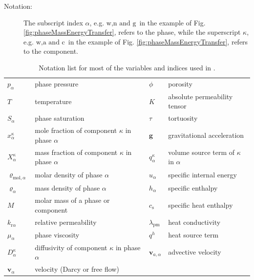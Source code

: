 \begin{description}
\item[Notation:]
The subscript index $\alpha$, e.g. $\text{w}, \text{n} \text{ and } \text{g}$ in the example of Fig. \ref{fig:phaseMassEnergyTransfer}, refers
to the phase, while the superscript $\kappa$, e.g. $\text{w}, \text{a} \text{ and } \text{c}$ in the example of Fig. \ref{fig:phaseMassEnergyTransfer},
refers to the component.
\end{description}

\begin{table}
\begin{tabular}{llll}
$p_\alpha$ & phase pressure & $\phi$ & porosity \\
$T$ & temperature & $K$ & absolute permeability tensor \\
$S_\alpha$ & phase saturation & $\tau$ & tortuosity \\
$x_\alpha^\kappa$ & mole fraction of component $\kappa$ in phase $\alpha$ & $\boldsymbol{g}$ & gravitational acceleration \\
$X_\alpha^\kappa$ & mass fraction of component $\kappa$ in phase $\alpha$ & $q^\kappa_\alpha$ & volume source term of $\kappa$ in $\alpha$ \\
$\varrho_{\text{mol},\alpha}$ & molar density of phase $\alpha$ & $u_\alpha$ & specific internal energy \\
$\varrho_{\alpha}$ & mass density of phase $\alpha$ & $h_\alpha$ & specific enthalpy \\
$M$ & molar mass of a phase or component & $c_\text{s}$ & specific heat enthalpy \\
$k_{\text{r}\alpha}$ & relative permeability & $\lambda_\text{pm}$ & heat conductivity \\
$\mu_\alpha$ & phase viscosity & $q^h$ & heat source term \\
$D_\alpha^\kappa$ & diffusivity of component $\kappa$ in phase $\alpha$ & $\boldsymbol{v}_{a,\alpha}$  & advective velocity \\
$\boldsymbol{v}_\alpha$ & velocity (Darcy or free flow)& & \\
\end{tabular}
\caption{Notation list for most of the variables and indices used in \Dumux.}

\end{table}

